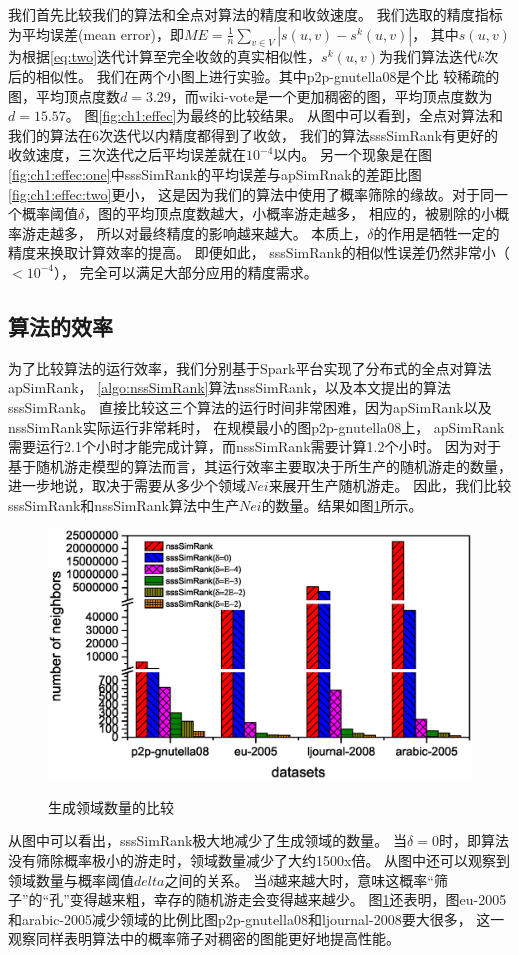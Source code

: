 \documentclass[master]{njuthesis}
\begin{document}
我们首先比较我们的算法和全点对算法的精度和收敛速度。
我们选取的精度指标为平均误差(mean error)，即$ME = \frac{1}{n}\sum_{v \in V}{\left|s(u,v) - s^k(u,v)\right|}$，
其中$s(u,v)$为根据\ref{eq:two}迭代计算至完全收敛的真实相似性，$s^k(u,v)$为我们算法迭代$k$次后的相似性。
我们在两个小图上进行实验。其中p2p-gnutella08是个比
较稀疏的图，平均顶点度数$d=3.29$，而wiki-vote是一个更加稠密的图，平均顶点度数为$d=15.57$。
图\ref{fig:ch1:effec}为最终的比较结果。
从图中可以看到，全点对算法和我们的算法在6次迭代以内精度都得到了收敛， 我们的算法sssSimRank有更好的收敛速度，三次迭代之后平均误差就在$10^{-4}$以内。
另一个现象是在图\ref{fig:ch1:effec:one}中sssSimRank的平均误差与apSimRnak的差距比图\ref{fig:ch1:effec:two}更小，
这是因为我们的算法中使用了概率筛除的缘故。对于同一个概率阈值$\delta$，图的平均顶点度数越大，小概率游走越多， 相应的，被剔除的小概率游走越多，
所以对最终精度的影响越来越大。 本质上，$\delta$的作用是牺牲一定的精度来换取计算效率的提高。
即便如此， sssSimRank的相似性误差仍然非常小（$<10^{-4}$）， 完全可以满足大部分应用的精度需求。
\subsection{算法的效率}
为了比较算法的运行效率，我们分别基于Spark平台实现了分布式的全点对算法apSimRank， \ref{algo:nssSimRank}算法nssSimRank，以及本文提出的算法sssSimRank。
直接比较这三个算法的运行时间非常困难，因为apSimRank以及nssSimRank实际运行非常耗时，
在规模最小的图p2p-gnutella08上， apSimRank需要运行2.1个小时才能完成计算，而nssSimRank需要计算1.2个小时。
因为对于基于随机游走模型的算法而言，其运行效率主要取决于所生产的随机游走的数量，进一步地说，取决于需要从多少个领域$Nei$来展开生产随机游走。
因此，我们比较sssSimRank和nssSimRank算法中生产$Nei$的数量。结果如图\ref{fig:ch1:runtime}所示。
\begin{figure}[h]
  \centering
  \includegraphics[width= 1\textwidth]{figure/neighborhoods.eps}\\
  \caption{生成领域数量的比较}\label{fig:ch1:runtime}
\end{figure}
从图中可以看出，sssSimRank极大地减少了生成领域的数量。
当$\delta=0$时，即算法没有筛除概率极小的游走时，领域数量减少了大约1500x倍。
从图中还可以观察到领域数量与概率阈值$delta$之间的关系。
当$\delta$越来越大时，意味这概率“筛子”的“孔”变得越来粗，幸存的随机游走会变得越来越少。
图\ref{fig:ch1:runtime}还表明，图eu-2005和arabic-2005减少领域的比例比图p2p-gnutella08和ljournal-2008要大很多，
这一观察同样表明算法中的概率筛子对稠密的图能更好地提高性能。
\end{document}

